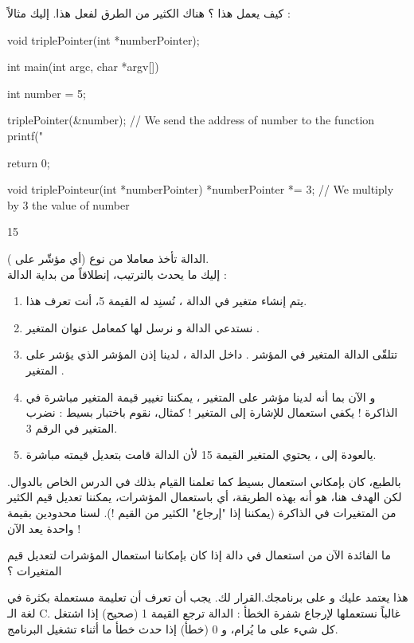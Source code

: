 كيف يعمل هذا ؟ هناك الكثير من الطرق لفعل هذا. إليك مثالاً :
\begin{Csource}
void triplePointer(int *numberPointer);

int main(int argc, char *argv[])
{
	int number = 5;

	triplePointer(&number); // We send the address of number to the function
	printf("%

	return 0;
}

void triplePointeur(int *numberPointer)
{
	*numberPointer *= 3; // We multiply by 3 the value of number
}
\end{Csource}
\begin{Console}
15
\end{Console}
الدالة
تأخذ معاملا من نوع
(أي مؤشّر على
).\\
إليك ما يحدث بالترتيب، إنطلاقاً من بداية الدالة
 :
\begin{enumerate}
	\item يتم إنشاء متغير
في الدالة
،
نُسنِد له القيمة 5، أنت تعرف هذا.
	\item نستدعي الدالة
و نرسل لها كمعامل عنوان المتغير
.
	\item تتلقّى الدالة
المتغير في المؤشر
.
داخل الدالة
، لدينا إذن المؤشر
الذي يؤشر على المتغير
.
	\item و الآن بما أنه لدينا مؤشر على المتغير
،
يمكننا تغيير قيمة المتغير
مباشرة في الذاكرة ! يكفي استعمال
للإشارة إلى المتغير
 !
كمثال، نقوم باختبار بسيط : نضرب المتغير في الرقم 3.
	\item يالعودة إلى
،
يحتوي المتغير
القيمة 15 لأن الدالة
قامت بتعديل قيمته مباشرة.
\end{enumerate}
بالطبع، كان بإمكاني استعمال
بسيط كما تعلمنا القيام بذلك في الدرس الخاص بالدوال. لكن الهدف هنا، هو أنه بهذه الطريقة، أي باستعمال المؤشرات، يمكننا تعديل قيم الكثير من المتغيرات في الذاكرة (يمكننا إذا "إرجاع" الكثير من القيم !). لسنا محدودين بقيمة واحدة يعد الآن !
\begin{question}
	ما الفائدة الآن من استعمال
في دالة إذا كان بإمكاننا استعمال المؤشرات لتعديل قيم المتغيرات ؟
\end{question}
هذا يعتمد عليك و على برنامجك.القرار لك. يجب أن تعرف أن تعليمة
مستعملة بكثرة في لغة الـ
\textenglish{C}.
غالباً نستعملها لإرجاع شفرة الخطأ : الدالة ترجع القيمة 1 (صحيح) إذا اشتغل كل شيء على ما يُرام، و 0 (خطأ) إذا حدث خطأ ما أثناء تشغيل البرنامج.
